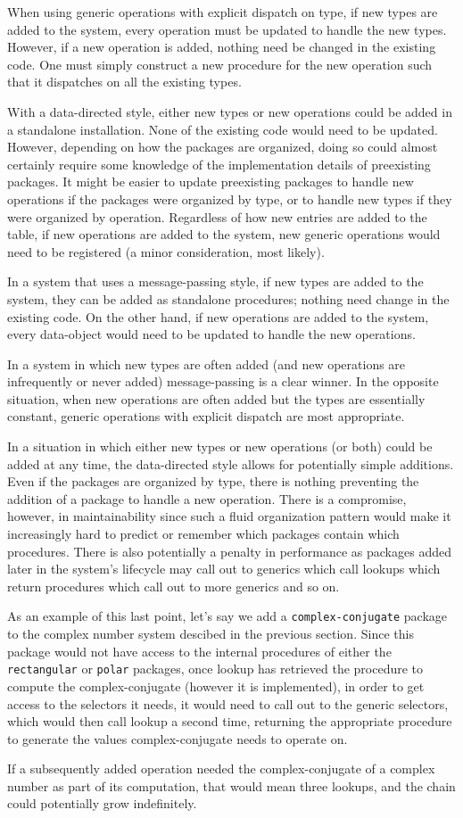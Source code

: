 \documentclass{article}
\def\code#1{\texttt{#1}}
\begin{document}
When using generic operations with explicit dispatch on type, if new types are added to the system, every operation must be updated to handle the new types. However, if a new operation is added, nothing need be changed in the existing code. One must simply construct a new procedure for the new operation such that it dispatches on all the existing types.

With a data-directed style, either new types or new operations could be added in a standalone installation. None of the existing code would need to be updated. However, depending on how the packages are organized, doing so could almost certainly require some knowledge of the implementation details of preexisting packages. It might be easier to update preexisting packages to handle new operations if the packages were organized by type, or to handle new types if they were organized by operation. Regardless of how new entries are added to the table, if new operations are added to the system, new generic operations would need to be registered (a minor consideration, most likely).

In a system that uses a message-passing style, if new types are added to the system, they can be added as standalone procedures; nothing need change in the existing code. On the other hand, if new operations are added to the system, every data-object would need to be updated to handle the new operations.

In a system in which new types are often added (and new operations are infrequently or never added) message-passing is a clear winner. In the opposite situation, when new operations are often added but the types are essentially constant, generic operations with explicit dispatch are most appropriate.

In a situation in which either new types or new operations (or both) could be added at any time, the data-directed style allows for potentially simple additions. Even if the packages are organized by type, there is nothing preventing the addition of a package to handle a new operation. There is a compromise, however, in maintainability since such a fluid organization pattern would make it increasingly hard to predict or remember which packages contain which procedures. There is also potentially a penalty in performance as packages added later in the system's lifecycle may call out to generics which call lookups which return procedures which call out to more generics and so on.

As an example of this last point, let's say we add a \code{complex-conjugate} package to the complex number system descibed in the previous section. Since this package would not have access to the internal procedures of either the \code{rectangular} or \code{polar} packages, once lookup has retrieved the procedure to compute the complex-conjugate (however it is implemented), in order to get access to the selectors it needs, it would need to call out to the generic selectors, which would then call lookup a second time, returning the appropriate procedure to generate the values complex-conjugate needs to operate on.

If a subsequently added operation needed the complex-conjugate of a complex number as part of its computation, that would mean three lookups, and the chain could potentially grow indefinitely.
\end{document}
